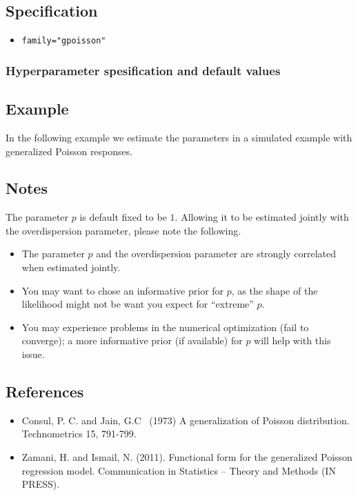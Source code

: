 \documentclass[a4paper,11pt]{article}
\begin{document}
\subsection*{Specification}

\begin{itemize}
\item \texttt{family="gpoisson"}
\end{itemize}


\subsubsection*{Hyperparameter spesification and default values}

    
\subsection*{Example}

In the following example we estimate the parameters in a simulated
example with generalized Poisson responses.



\subsection*{Notes}

The parameter $p$ is default fixed to be $1$. Allowing it to be
estimated jointly with the overdispersion parameter, please note the
following.
\begin{itemize}
\item The parameter $p$ and the overdispersion parameter are strongly
    correlated when estimated jointly.
\item You may want to chose an informative prior for $p$, as the shape
    of the likelihood might not be want you expect for ``extreme'' $p$.
\item You may experience problems in the numerical optimization (fail
    to converge); a more informative prior (if available) for $p$ will
    help with this issue.
\end{itemize}

\subsection*{References}

\begin{itemize}
\item Consul, P. C. and Jain, G.C~ (1973) A generalization of Poisson
    distribution. Technometrics 15, 791-799.
\item Zamani, H.  and Ismail, N. (2011). Functional form for the
    generalized Poisson regression model.  Communication in Statistics
    -- Theory and Methods (IN PRESS).
\end{itemize}
\end{document}
